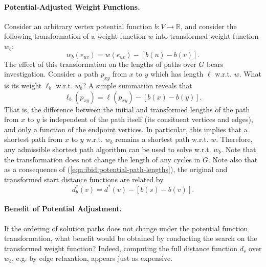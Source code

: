 \paragraph{Potential-Adjusted Weight Functions.}
Consider an arbitrary vertex potential function
$b : V \rightarrow \mathbb{R}$,
and consider the following transformation of a weight
function $w$ into transformed weight function $w_b$:
\begin{equation}
   w_b(e_{uv}) = w(e_{uv}) - \left[ b(u) - b(v) \right].
   \label{eqn:ibid:potential-transformation}
\end{equation}
The effect of this transformation on the lengths of paths over $G$
bears investigation.
Consider a path $p_{xy}$ from $x$ to $y$ which has length $\ell$ w.r.t. $w$.
What is its weight $\ell_b$ w.r.t. $w_b$?
A simple summation reveals that
\begin{equation}
   \ell_b(p_{xy}) = \ell(p_{xy}) - \left[ b(x) - b(y) \right].
   \label{eqn:ibid:potential-path-lengths}
\end{equation}
That is, the difference between the initial and transformed lengths
of the path from $x$ to $y$ is independent of the path itself
(its consituent vertices and edges),
and only a function of the endpoint vertices.
In particular,
this implies that a shortest path from $x$ to $y$ w.r.t. $w_b$
remains a shortest path w.r.t. $w$.
Therefore, any admissible shortest path algorithm can be used to
solve w.r.t. $w_b$.
Note that the transformation does not change the length of any
cycles in $G$.
Note also that as a consequence of
(\ref{eqn:ibid:potential-path-lengths}),
the original and transformed start distance functions are related by
\begin{equation}
   d^*_b(v) = d^*(v) - \left[ b(s) - b(v) \right].
\end{equation}

\paragraph{Benefit of Potential Adjustment.}
If the ordering of solution paths does not change under the
potential function transformation,
what benefit would be obtained by conducting the search
on the transformed weight function?
Indeed,
computing the full distance function $d_s$ over $w_b$,
e.g. by edge relaxation,
appears just as expensive.

